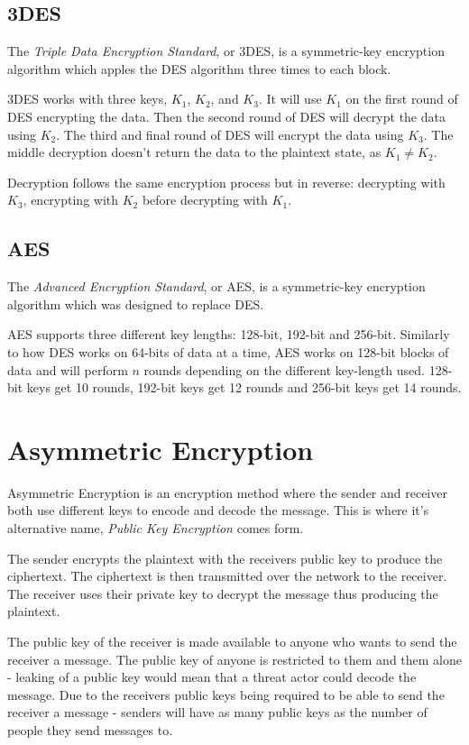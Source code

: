 \subsection{3DES}
The \textit{Triple Data Encryption Standard}, or 3DES, is a symmetric-key encryption algorithm which apples the DES algorithm three times to each block. 

3DES works with three keys, $K_1$, $K_2$, and $K_3$. It will use $K_1$ on the first round of DES encrypting the data. Then the second round of DES will decrypt the data using $K_2$. The third and final round of DES will encrypt the data using $K_3$. The middle decryption doesn't return the data to the plaintext state, as $K_1 \neq K_2$. 

Decryption follows the same encryption process but in reverse: decrypting with $K_3$, encrypting with $K_2$ before decrypting with $K_1$. 

\subsection{AES}
The \textit{Advanced Encryption Standard}, or AES, is a symmetric-key encryption algorithm which was designed to replace DES.

AES supports three different key lengths: 128-bit, 192-bit and 256-bit. Similarly to how DES works on 64-bits of data at a time, AES works on 128-bit blocks of data and will perform $n$ rounds depending on the different key-length used. 128-bit keys get 10 rounds, 192-bit keys get 12 rounds and 256-bit keys get 14 rounds. 

\section{Asymmetric Encryption}
Asymmetric Encryption is an encryption method where the sender and receiver both use different keys to encode and decode the message. This is where it's alternative name, \textit{Public Key Encryption} comes form.

The sender encrypts the plaintext with the receivers public key to produce the ciphertext. The ciphertext is then transmitted over the network to the receiver. The receiver uses their private key to decrypt the message thus producing the plaintext. 

The public key of the receiver is made available to anyone who wants to send the receiver a message. The public key of anyone is restricted to them and them alone - leaking of a public key would mean that a threat actor could decode the message. Due to the receivers public keys being required to be able to send the receiver a message - senders will have as many public keys as the number of people they send messages to.

